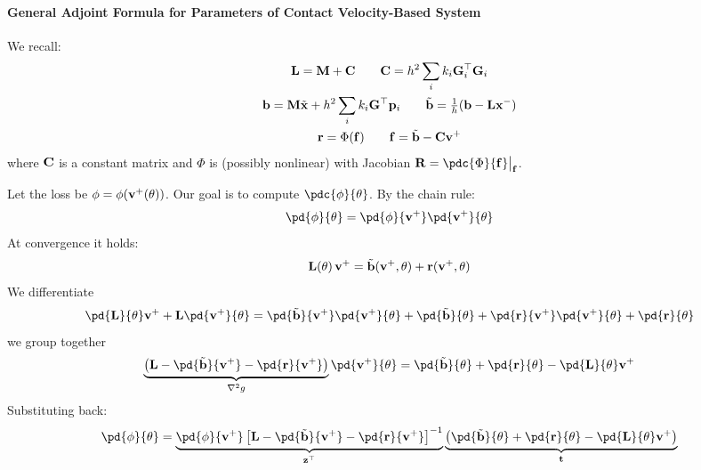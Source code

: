 \begin{derivation}
\paragraph{General Adjoint Formula for Parameters of Contact Velocity-Based System}\mbox{}\par\medskip

\begin{reminder}
We recall:
\begin{gather*}
    \mathbf{L} = \mathbf{M} + \mathbf{C} \qquad \mathbf{C} = h^2\sum_i k_i\mathbf{G}_i^\top\mathbf{G}_i\\
    \mathbf{b} = \mathbf{M}\tilde{\mathbf{x}} + h^2\sum_ik_i\mathbf{G}^\top\mathbf{p}_i 
    \qquad \tilde{\mathbf{b}} = \tfrac{1}{h}(\mathbf{b} - \mathbf{L}\mathbf{x}^-) \\
    \mathbf{r} = \Phi(\mathbf{f}) \qquad \mathbf{f} = \tilde{\mathbf{b}} - \mathbf{C}\mathbf{v}^+
\end{gather*}
where $\mathbf{C}$ is a constant matrix and $\Phi$ is (possibly nonlinear) with Jacobian $\R = \pdc{\Phi}{\f}\big|_\f$. 
\end{reminder}
Let the loss be $\phi = \phi(\mathbf{v}^+(\theta))$. Our goal is to compute $\pdc{\phi}{\theta}$.
\newline By the chain rule:
\begin{equation*}
    \pd{\phi}{\theta}
    =
    \pd{\phi}{\vv^+}
    \pd{\vv^+}{\theta}
\end{equation*}
At convergence it holds:
\begin{equation*}
    \mathbf{L}(\theta)\,\mathbf{v}^+ = \tilde{\mathbf{b}}(\mathbf{v}^+, \theta) + \mathbf{r}(\mathbf{v}^+, \theta)
\end{equation*}
We differentiate
\begin{equation*}
    \pd{\LL}{\theta}\vv^+ + \LL\pd{\vv^+}{\theta} = 
    \pd{\tilde\bb}{\vv^+}\pd{\vv^+}{\theta} + \pd{\tilde\bb}{\theta} + 
    \pd{\rr}{\vv^+}\pd{\vv^+}{\theta} + \pd{\rr}{\theta}
\end{equation*}
we group together
\begin{equation*}
    \underbrace{\left(\LL -\pd{\tilde\bb}{\vv^+} - \pd{\rr}{\vv^+}\right)}_{\nabla^2g}
     \pd{\vv^+}{\theta} = 
     \pd{\tilde\bb}{\theta} + \pd{\rr}{\theta} - \pd{\LL}{\theta}\vv^+
\end{equation*}
Substituting back:
\begin{equation}
    \pd{\phi}{\theta} = 
    \underbrace{\pd{\phi}{\vv^+}\left[ \LL -\pd{\tilde\bb}{\vv^+} - \pd{\rr}{\vv^+} \right]^{-1}}_{\z^\top}
    \underbrace{\left(\pd{\tilde\bb}{\theta} + \pd{\rr}{\theta} - \pd{\LL}{\theta}\vv^+\right)}_\mathbf{t}
\end{equation}


\end{derivation}
